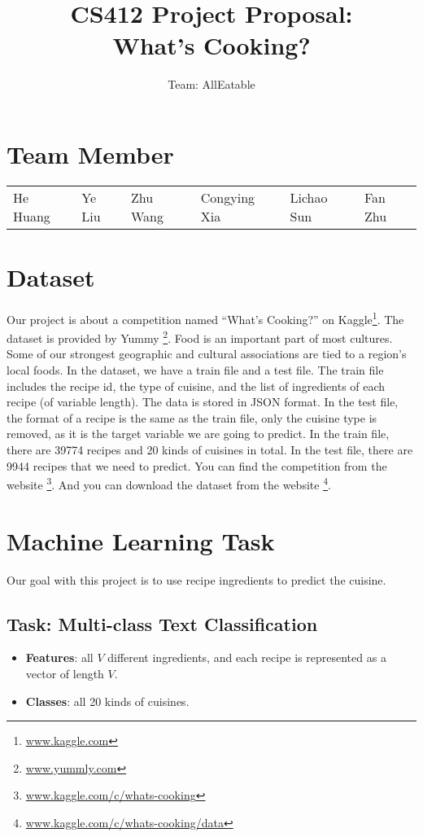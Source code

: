 \documentclass{article}
\title{\textbf{CS412 Project Proposal}: \\ What's Cooking?}
\author{Team: AllEatable}
\date{}
\begin{document}
\maketitle

\section{Team Member}
\begin{tabular}{l l l l l l}
    He Huang & Ye Liu & Zhu Wang & Congying Xia & Lichao Sun & Fan Zhu
\end{tabular}
\section{Dataset}
Our project is about a competition named “What’s Cooking?” on Kaggle\footnote[1]{\url{www.kaggle.com}}. The dataset is provided by Yummy \footnote[2]{\url{www.yummly.com}}.  
Food is an important part of most cultures. Some of our strongest geographic and cultural associations are tied to a region's local foods. In the dataset, we have a train file and a test file. The train file includes the recipe id, the type of cuisine, and the list of ingredients of each recipe (of variable length). The data is stored in JSON format. In the test file, the format of a recipe is the same as the train file, only the cuisine type is removed, as it is the target variable we are going to predict.
In the train file, there are 39774 recipes and 20 kinds of cuisines in total. In the test file, there are 9944 recipes that we need to predict.
You can find the competition from the website        		   \footnote[3]{\url{www.kaggle.com/c/whats-cooking}}.
And you can download the dataset from the website		 \footnote[4]{\url{www.kaggle.com/c/whats-cooking/data}}.
\section{Machine Learning Task}
Our goal with this project is to use recipe ingredients to predict the cuisine.
\subsection{Task:  Multi-class Text Classification}
\begin{itemize}
    \item \textbf{Features}: all $V$ different ingredients, and each recipe is represented as a vector of length $V$.
    \item \textbf{Classes}: all 20 kinds of cuisines. 
\end{itemize}
\end{document}
